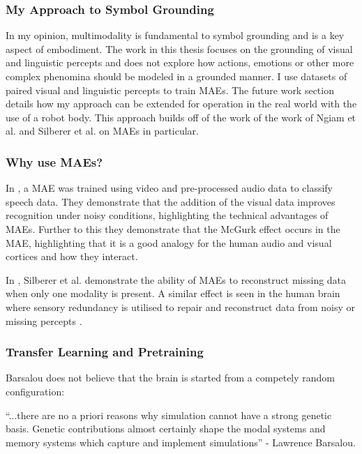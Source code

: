 \subsubsection{My Approach to Symbol Grounding}

In my opinion, multimodality is fundamental to symbol grounding and is a key aspect of embodiment. The work in this thesis focuses on the grounding of visual and linguistic percepts and does not explore how actions, emotions or other more complex phenomina should be modeled in a grounded manner. I use datasets of paired visual and linguistic percepts to train \acp{MAE}. The future work section details how my approach can be extended for operation in the real world with the use of a robot body. This approach builds off of the work of the work of Ngiam et al. \cite{ngiam2011multimodal} and Silberer et al.\cite{silberer2014learning} on \acp{MAE} in particular.

\subsubsection{Why use MAEs?}
In \cite{ngiam2011multimodal}, a \ac{MAE} was trained using video and pre-processed audio data to classify speech data. They demonstrate that the addition of the visual data improves recognition under noisy conditions, highlighting the technical advantages of \acp{MAE}. Further to this they demonstrate that the McGurk effect \cite{mcgurk1976hearing} occurs in the \ac{MAE}, highlighting that it is a good analogy for the human audio and visual cortices and how they interact.

In \cite{silberer2014learning}, Silberer et al. demonstrate the ability of \acp{MAE} to reconstruct missing data when only one modality is present. A similar effect is seen in the human brain where sensory redundancy is utilised to repair and reconstruct data from noisy or missing percepts \cite{samuel1997lexical}. 

\subsubsection{Transfer Learning and Pretraining}

Barsalou \cite{barsalou2008grounded} does not believe that the brain is started from a competely random configuration:
\begin{displayquote}
``...there are no a priori reasons why simulation cannot have a strong genetic basis. Genetic contributions almost certainly shape the modal systems and memory systems which capture and implement simulations'' - Lawrence Barsalou.
\end{displayquote}

